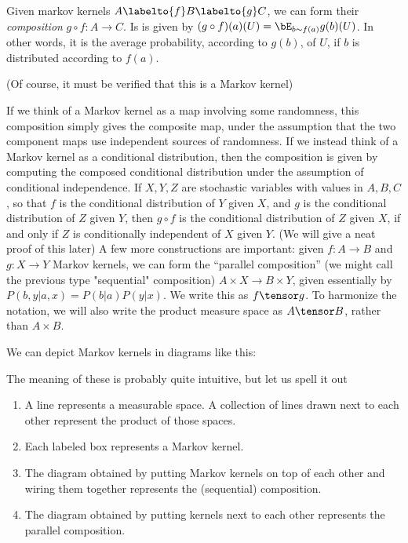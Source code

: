 \documentclass{article}
\begin{document}
\begin{definition}
Given markov kernels $A \labelto{f} B \labelto{g} C$, we can form their \emph{composition} $g\circ f: A \to C$.
Is is given by $(g\circ f)(a)(U) = \bE_{b \sim f(a)}g(b)(U)$.
In other words, it is the average probability, according to $g(b)$, of $U$, if $b$ is distributed according to $f(a)$.
\end{definition}
(Of course, it must be verified that this is a Markov kernel)

If we think of a Markov kernel as a map involving some randomness, this composition simply gives the composite map, under the assumption that the two component maps use independent sources of randomness.
If we instead think of a Markov kernel as a conditional distribution, then the composition is given by computing the composed conditional distribution under the assumption of conditional independence.
If $X, Y, Z$ are stochastic variables with values in $A,B,C$, so that $f$ is the conditional distribution of $Y$ given $X$, and $g$ is the conditional distribution of $Z$ given $Y$, then $g\circ f$ is the conditional distribution of $Z$ given $X$, if and only if $Z$ is conditionally independent of $X$ given $Y$. (We will give a neat proof of this later)
A few more constructions are important: given $f:A \to B$ and $g:X \to Y$ Markov kernels, we can form the ``parallel composition'' (we might call the previous type "sequential" composition) $A \times X \to B \times Y$,
given essentially by $P(b,y|a,x) = P(b|a)P(y|x)$. We write this as $f \tensor g$. To harmonize the notation, we will also write the product measure space as $A \tensor B$, rather than $A \times B$.


We can depict Markov kernels in diagrams like this:

The meaning of these is probably quite intuitive, but let us spell it out

\begin{enumerate}
    \item A line represents a measurable space. A collection of lines drawn next to each other represent the product of those spaces. 
    \item Each labeled box represents a Markov kernel.
    \item The diagram obtained by putting Markov kernels on top of each other and wiring them together represents the (sequential) composition.
    \item The diagram obtained by putting kernels next to each other represents the parallel composition.\footnotemark
\end{enumerate}
\end{document}
